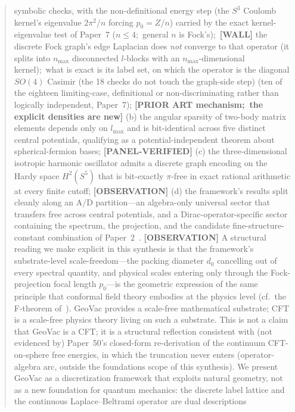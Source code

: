 \documentclass[aps,pra,twocolumn,superscriptaddress,longbibliography]{revtex4-2}
\newcommand{\gvc}[2]{#2}
\begin{document}
\begin{abstract}
symbolic checks, with the non-definitional energy step (the $S^3$
Coulomb kernel's eigenvalue $2\pi^2/n$ forcing $p_0 = Z/n$) carried by
the exact kernel-eigenvalue test of Paper~7 ($n \le 4$;\ general $n$ is
Fock's);\ \textbf{[WALL]} the discrete Fock \gvc{graph-s3-wall}{graph's edge
Laplacian does \emph{not} converge to that operator (it splits into
$n_{\max}$ disconnected $l$-blocks with an $n_{\max}$-dimensional
kernel)};\ what is exact is its label set, on which the operator is the
diagonal $SO(4)$ Casimir (the 18 checks
do not touch the graph-side step) (ten of the eighteen limiting-case,
definitional or non-discriminating rather than logically independent,
Paper~7); \textbf{[PRIOR ART mechanism;\ the explicit densities are
new]} (b) the angular sparsity of two-body matrix elements
depends only on $l_{\max}$ and is bit-identical across five distinct
central potentials, qualifying as a potential-independent theorem
about spherical-fermion bases; \textbf{[PANEL-VERIFIED]} (c) the three-dimensional isotropic
harmonic oscillator admits a discrete graph encoding on the Hardy
space $H^2(S^5)$ that is bit-exactly $\pi$-free in exact rational
arithmetic at every finite cutoff; \textbf{[OBSERVATION]} (d) the framework's results split
cleanly along an A/D partition---an algebra-only universal sector that
transfers free across central potentials, and a Dirac-operator-specific
sector containing the spectrum, the projection, and the
candidate fine-structure-constant combination of Paper~2~\cite{loutey_paper2_alpha}.  \textbf{[OBSERVATION]} A structural reading we make explicit in this synthesis is that
the framework's substrate-level scale-freedom---the packing diameter
$d_{0}$ cancelling out of every spectral quantity, and physical
scales entering only through the Fock-projection focal length
$p_{0}$---is the geometric expression of the same principle that
conformal field theory embodies at
the physics level (cf.\ the F-theorem of~\cite{klebanov_pufu_safdi2011}).  GeoVac provides a scale-free mathematical
substrate; CFT is a scale-free physics theory living on such a
substrate.  This is not a claim that GeoVac is a CFT; it is a
structural reflection consistent with (not evidenced by) Paper~50's
closed-form re-derivation of the continuum CFT-on-sphere free energies,
in which the truncation never enters (operator-algebra arc, outside the
foundations scope of this synthesis).  We present
GeoVac as a discretization framework that exploits natural geometry,
not as a new foundation for quantum mechanics: the discrete label
lattice and the continuous Laplace--Beltrami operator are dual descriptions

\end{abstract}
\end{document}
